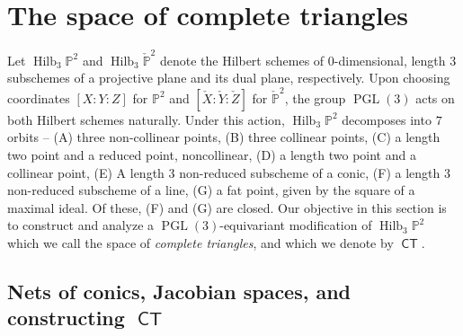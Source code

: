 \documentclass{article}
\renewcommand{\P}{\mathbb{P}}
\DeclareMathOperator{\PGL}{PGL}
\DeclareMathOperator{\Hilb}{Hilb}
\DeclareMathOperator{\CT}{\mathsf{CT}}
\begin{document}
\section{The space of complete triangles}
\label{sec:completetriangles}

Let $\Hilb_{3}\P^{2}$ and $\Hilb_{3}\check{\P}^{2}$ denote the Hilbert
schemes of $0$-dimensional, length $3$ subschemes of a projective
plane and its dual plane, respectively.  Upon choosing coordinates $[X:Y:Z]$ for $\P^{2}$ and $[\check{X}:\check{Y}:\check{Z}]$ for $\check{\P}^{2}$, the group
$\PGL(3)$ acts on both Hilbert schemes naturally.
Under this action, $\Hilb_{3}\P^{2}$ decomposes into $7$ orbits -- (A) three non-collinear points, (B) three collinear points, (C) a length two point and a reduced point, noncollinear, (D) a length two point and a collinear point, (E) A length 3 non-reduced subscheme of a conic, (F) a length 3 non-reduced subscheme of a line, (G) a fat point, given by the square of a maximal ideal.  Of these, (F) and (G) are closed.   Our objective in this section is to construct and analyze a $\PGL(3)$-equivariant modification of $\Hilb_{3}\P^{2}$ which we call the space of {\sl complete triangles}, and which we denote by $\CT$.

\subsection{Nets of conics, Jacobian spaces, and constructing $\CT$}
\end{document}
